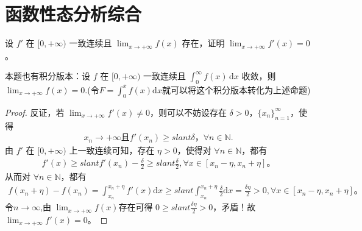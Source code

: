 \documentclass[../../main.tex]{subfiles}
\begin{document}
\section{函数性态分析综合}

\begin{proposition}\label{proposition:经典导数一致连续问题}
设 $f'$ 在 $[0,+\infty)$ 一致连续且 $\lim_{x \to +\infty} f(x)$ 存在，证明 $\lim_{x \to +\infty} f'(x) = 0$。
\end{proposition}
\begin{note}
本题也有积分版本：设 $f$ 在 $[0,+\infty)$ 一致连续且 $\int_{0}^{\infty} f(x) \, \mathrm{d}x$ 收敛，则 $\lim_{x \to +\infty} f(x) = 0$.(令$F=\int_0^x{f\left( x \right) \mathrm{d}x}$就可以将这个积分版本转化为上述命题)
\end{note}
\begin{proof}
反证，若 $\lim_{x\rightarrow +\infty} f'(x) \ne 0$，则可以不妨设存在 $\delta >0$，$\{ x_n \}_{n=1}^{\infty}$，使得
\begin{align*}
x_n\rightarrow +\infty \text{且} f'(x_n) \geqslant slant \delta，\forall n\in \mathbb{N}.    
\end{align*}
由 $f'$ 在 $[0,+\infty)$ 上一致连续可知，存在 $\eta >0$，使得对 $\forall n\in \mathbb{N}$，都有
\begin{align*}
f'(x) \geqslant slant f'(x_n) -\frac{\delta}{2} \geqslant slant \frac{\delta}{2}, \forall x\in [x_n-\eta ,x_n+\eta] 。
\end{align*}
从而对 $\forall n\in \mathbb{N}$，都有
\begin{align*}
f(x_n+\eta) -f(x_n) =\int_{x_n}^{x_n+\eta} f'(x) \mathrm{d}x \geqslant slant \int_{x_n}^{x_n+\eta} \frac{\delta}{2} \mathrm{d}x = \frac{\delta \eta}{2} > 0, \forall x\in [x_n-\eta ,x_n+\eta] 。
\end{align*}
令$n\rightarrow \infty$,由 $\lim_{x\rightarrow +\infty} f(x) $存在可得 $0 \geqslant slant \frac{\delta \eta}{2} > 0$，矛盾！故 $\lim_{x\rightarrow +\infty} f'(x) =0$。
\end{proof}
\end{document}
